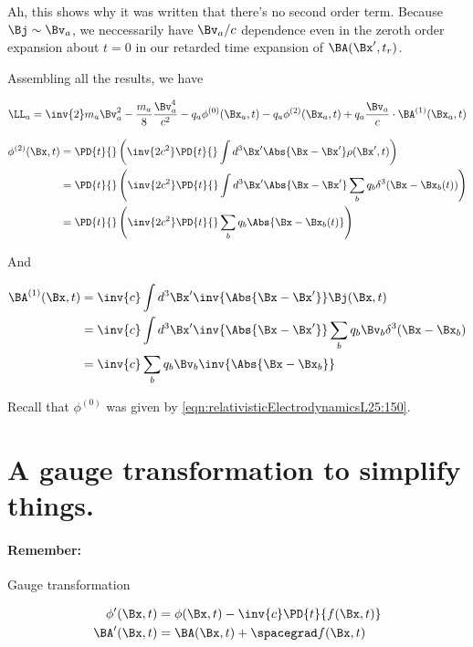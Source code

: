 Ah, this shows why it was written that there's no second order term.  Because $\Bj \sim \Bv_a$, we neccessarily have $\Bv_a/c$ dependence even in the zeroth order expansion about $t=0$ in our retarded time expansion of $\BA(\Bx', t_r)$.

Assembling all the results, we have

\begin{equation}\label{eqn:relativisticElectrodynamicsL25:330}
\LL_a = \inv{2} m_a \Bv_a^2 - \frac{m_a}{8} \frac{\Bv_a^4}{c^2} - q_a \phi^{(0)}(\Bx_a, t) - q_a \phi^{(2)}(\Bx_a, t) + q_a \frac{\Bv_a}{c} \cdot \BA^{(1)}(\Bx_a, t)
\end{equation}

\begin{align*}
\phi^{(2)}(\Bx, t) 
&= \PD{t}{} \left( \inv{2 c^2} \PD{t}{} \int d^3 \Bx' \Abs{\Bx - \Bx'} \rho(\Bx', t) \right) \\
&= \PD{t}{} \left( \inv{2 c^2} \PD{t}{} \int d^3 \Bx' \Abs{\Bx - \Bx'} \sum_b q_b \delta^3(\Bx - \Bx_b(t)) \right) \\
&= \PD{t}{} \left( \inv{2 c^2} \PD{t}{} \sum_b q_b \Abs{\Bx - \Bx_b(t)} \right)
\end{align*}

And 

\begin{align*}
\BA^{(1)}(\Bx, t) 
&= \inv{c} \int d^3 \Bx' \inv{\Abs{\Bx - \Bx'}} \Bj(\Bx, t) \\
&= \inv{c} \int d^3 \Bx' \inv{\Abs{\Bx - \Bx'}} \sum_b q_b \Bv_b \delta^3(\Bx -\Bx_b) \\
&= \inv{c} \sum_b q_b \Bv_b \inv{\Abs{\Bx -\Bx_b}} \\
\end{align*}

Recall that $\phi^{(0)}$ was given by \ref{eqn:relativisticElectrodynamicsL25:150}.

\section{A gauge transformation to simplify things.}

\paragraph{Remember:} Gauge transformation

\begin{align}\label{eqn:relativisticElectrodynamicsL25:350}
\phi'(\Bx, t) &= \phi(\Bx, t) - \inv{c} \PD{t}{f(\Bx, t)} \\
\BA'(\Bx, t) &= \BA(\Bx, t) + \spacegrad f(\Bx, t) \\
\end{align}

